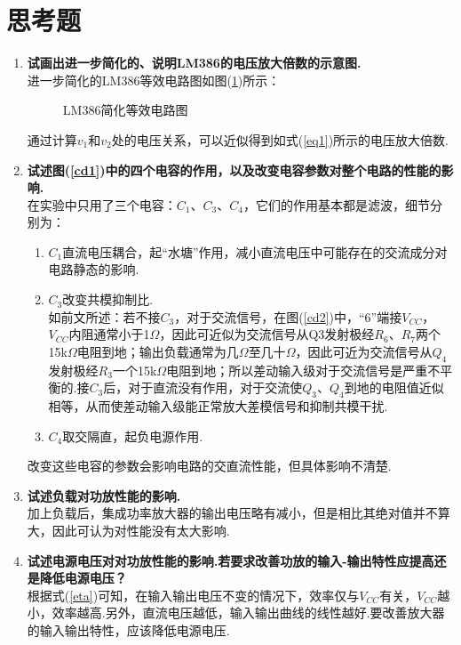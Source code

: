 \documentclass[a4paper]{article}
\begin{document}
\section{思考题}
\begin{enumerate}
\item \textbf{试画出进一步简化的、说明LM386的电压放大倍数的示意图.}\\
进一步简化的LM386等效电路图如图(\ref{LM386s})所示：
\begin{figure}[!h]
\centering
{}
\caption{LM386简化等效电路图}\label{LM386s}
\end{figure}

通过计算$v_1$和$v_2$处的电压关系，可以近似得到如式(\ref{eq1})所示的电压放大倍数.
\item \textbf{试述图(\ref{cd1})中的四个电容的作用，以及改变电容参数对整个电路的性能的影响.}\\
在实验中只用了三个电容：$C_1$、$C_3$、$C_4$，它们的作用基本都是滤波，细节分别为：
\begin{enumerate}
\item $C_1$直流电压耦合，起“水塘”作用，减小直流电压中可能存在的交流成分对电路静态的影响.
\item $C_3$改变共模抑制比.\\
如前文所述：若不接$C_3$，对于交流信号，在图(\ref{cd2})中，“6”端接$V_{CC}$，$V_{CC}$内阻通常小于1$\Omega$，因此可近似为交流信号从Q3发射极经$R_6$、$R_7$两个15k$\Omega$电阻到地；输出负载通常为几$\Omega$至几十$\Omega$，因此可近为交流信号从$Q_4$发射极经$R_3$一个15k$\Omega$电阻到地；所以差动输入级对于交流信号是严重不平衡的.接$C_3$后，对于直流没有作用，对于交流使$Q_3$、$Q_4$到地的电阻值近似相等，从而使差动输入级能正常放大差模信号和抑制共模干扰.
\item $C_4$取交隔直，起负电源作用.
\end{enumerate}
改变这些电容的参数会影响电路的交直流性能，但具体影响不清楚.
\item \textbf{试述负载对功放性能的影响.}\\
加上负载后，集成功率放大器的输出电压略有减小，但是相比其绝对值并不算大，因此可认为对性能没有太大影响.
\item \textbf{试述电源电压对对功放性能的影响.若要求改善功放的输入-输出特性应提高还是降低电源电压？}\\
根据式(\ref{eta})可知，在输入输出电压不变的情况下，效率仅与$V_{CC}$有关，$V_{CC}$越小，效率越高.另外，直流电压越低，输入输出曲线的线性越好.要改善放大器的输入输出特性，应该降低电源电压.
\end{enumerate}

\nocite{jiaocai}

\end{document}
